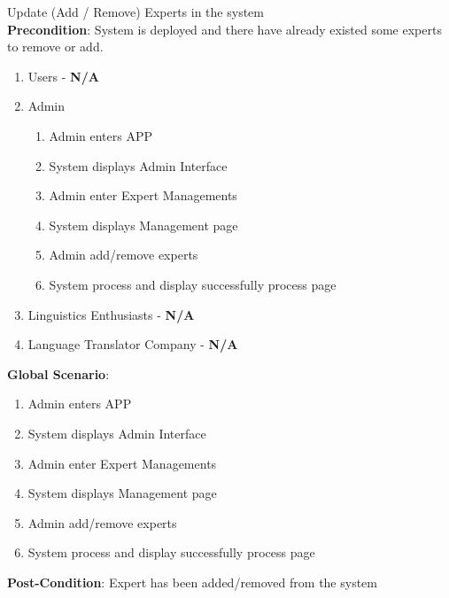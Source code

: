 \item Update (Add / Remove) Experts in the system 
	\\ \textbf{Precondition}: System is deployed and there have already existed some experts to remove or add.
	\begin{enumerate}[{\bf VP1.}]
		\item Users - \textbf{N/A}
		\item Admin
		\begin{enumerate}[{\bf 1.}]
			\item Admin enters APP
			\item System displays Admin Interface
			\item Admin enter Expert Managements
			\item System displays Management page
			\item Admin add/remove experts
			\item System process and display successfully process page

		\end{enumerate}
		\item Linguistics Enthusiasts - \textbf{N/A}
		\item Language Translator Company - \textbf{N/A}
	\end{enumerate}
	\textbf{Global Scenario}:
	\begin{enumerate}[{\bf 1.}]
		\item Admin enters APP
		\item System displays Admin Interface
		\item Admin enter Expert Managements
		\item System displays Management page
		\item Admin add/remove experts
		\item System process and display successfully process page

	\end{enumerate}
	\textbf{Post-Condition}: Expert has been added/removed from the system
